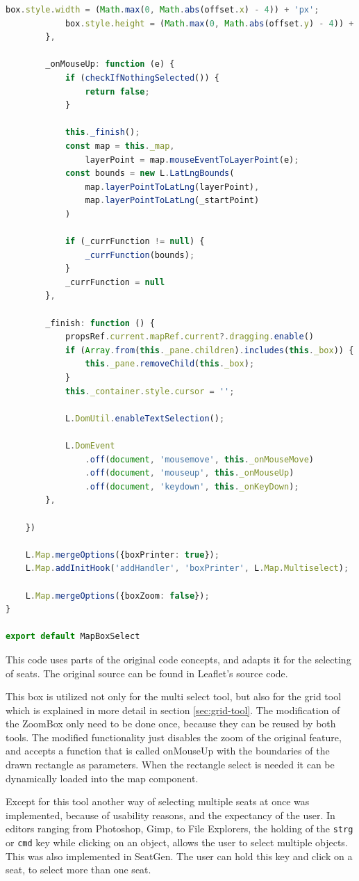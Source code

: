 \begin{lstlisting}[language=Typescript, caption={Multiselect Tool},label={lst:multiselect-tool}]
            box.style.width = (Math.max(0, Math.abs(offset.x) - 4)) + 'px';
            box.style.height = (Math.max(0, Math.abs(offset.y) - 4)) + 'px';
        },

        _onMouseUp: function (e) {
            if (checkIfNothingSelected()) {
                return false;
            }

            this._finish();
            const map = this._map,
                layerPoint = map.mouseEventToLayerPoint(e);
            const bounds = new L.LatLngBounds(
                map.layerPointToLatLng(layerPoint),
                map.layerPointToLatLng(_startPoint)
            )

            if (_currFunction != null) {
                _currFunction(bounds);
            }
            _currFunction = null
        },

        _finish: function () {
            propsRef.current.mapRef.current?.dragging.enable()
            if (Array.from(this._pane.children).includes(this._box)) {
                this._pane.removeChild(this._box);
            }
            this._container.style.cursor = '';

            L.DomUtil.enableTextSelection();

            L.DomEvent
                .off(document, 'mousemove', this._onMouseMove)
                .off(document, 'mouseup', this._onMouseUp)
                .off(document, 'keydown', this._onKeyDown);
        },

    })

    L.Map.mergeOptions({boxPrinter: true});
    L.Map.addInitHook('addHandler', 'boxPrinter', L.Map.Multiselect);

    L.Map.mergeOptions({boxZoom: false});
}

export default MapBoxSelect
\end{lstlisting}

This code uses parts of the original code concepts, and adapts it for the selecting of seats. The original source can be found in Leaflet's source code.

This box is utilized not only for the multi select tool, but also for the grid tool which is explained in more detail in section \ref{sec:grid-tool}. The modification of the ZoomBox only need to be done once, because they can be reused by both tools. The modified functionality just disables the zoom of the original feature, and accepts a function that is called onMouseUp with the boundaries of the drawn rectangle as parameters. When the rectangle select is needed it can be dynamically loaded into the map component.

Except for this tool another way of selecting multiple seats at once was implemented, because of usability reasons, and the expectancy of the user. In editors ranging from Photoshop, Gimp, to File Explorers, the holding of the \texttt{strg} or \texttt{cmd} key while clicking on an object, allows the user to select multiple objects. This was also implemented in SeatGen. The user can hold this key and click on a seat, to select more than one seat.
